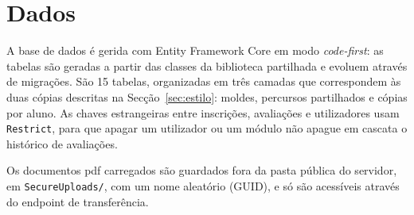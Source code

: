 \section{Dados}

A base de dados é gerida com Entity Framework Core em modo \emph{code-first}: as tabelas são geradas a partir das classes da biblioteca partilhada e evoluem através de migrações. São 15 tabelas, organizadas em três camadas que correspondem às duas cópias descritas na Secção~\ref{sec:estilo}: moldes, percursos partilhados e cópias por aluno. As chaves estrangeiras entre inscrições, avaliações e utilizadores usam \texttt{Restrict}, para que apagar um utilizador ou um módulo não apague em cascata o histórico de avaliações.

Os documentos \gls{pdf} carregados são guardados fora da pasta pública do servidor, em \texttt{SecureUploads/}, com um nome aleatório (GUID), e só são acessíveis através do endpoint de transferência.

